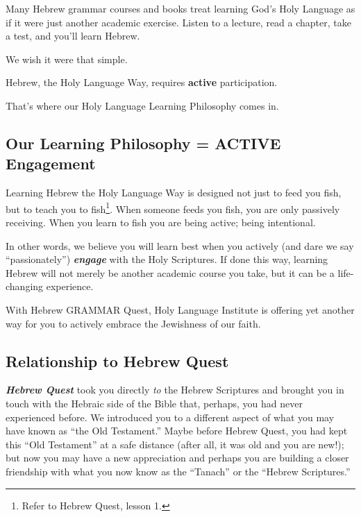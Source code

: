 \documentclass[
]{turabian-researchpaper}
\begin{document}
Many Hebrew grammar courses and books treat learning God's Holy Language as if it were just another academic exercise. Listen to a lecture, read a chapter, take a test, and you'll learn Hebrew.

We wish it were that simple.

Hebrew, the Holy Language Way, requires \textbf{active} participation.

That's where our Holy Language Learning Philosophy comes in.

\hypertarget{our-learning-philosophy-active-engagement}{%
\subsection*{Our Learning Philosophy = ACTIVE Engagement}\label{our-learning-philosophy-active-engagement}}

Learning Hebrew the Holy Language Way is designed not just to feed you fish, but to teach you to fish\footnote{Refer to Hebrew Quest, lesson 1.}. When someone feeds you fish, you are only passively receiving. When you learn to fish you are being active; being intentional.

In other words, we believe you will learn best when you actively (and dare we say ``passionately'') \textbf{\emph{engage}} with the Holy Scriptures. If done this way, learning Hebrew will not merely be another academic course you take, but it can be a life-changing experience.

With Hebrew GRAMMAR Quest, Holy Language Institute is offering yet another way for you to actively embrace the Jewishness of our faith.

\hypertarget{relationship-to-hebrew-quest}{%
\subsection*{Relationship to Hebrew Quest}\label{relationship-to-hebrew-quest}}

\textbf{\emph{Hebrew Quest}} took you directly \emph{to} the Hebrew Scriptures and brought you in touch with the Hebraic side of the Bible that, perhaps, you had never experienced before. We introduced you to a different aspect of what you may have known as ``the Old Testament.'' Maybe before Hebrew Quest, you had kept this ``Old Testament'' at a safe distance (after all, it was old and you are new!); but now you may have a new appreciation and perhaps you are building a closer friendship with what you now know as the ``Tanach'' or the ``Hebrew Scriptures.''
\end{document}
